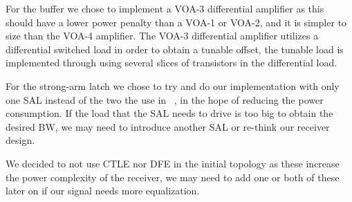 For the buffer we chose to implement a VOA-3 differential amplifier as this should have a lower power penalty than a VOA-1 or VOA-2, and it is simpler to size than the VOA-4 amplifier. The VOA-3 differential amplifier utilizes a differential switched load in order to obtain a tunable offset, the tunable load is implemented through using several slices of transistors in the differential load.

For the strong-arm latch we chose to try and do our implementation with only one SAL instead of the two the use in ~\cite{mahony2010a}, in the hope of reducing the power consumption. If the load that the SAL needs to drive is too big to obtain the desired BW, we may need to introduce another SAL or re-think our receiver design.

We decided to not use CTLE nor DFE in the initial topology as these increase the power complexity of the receiver, we may need to add one or both of these later on if our signal needs more equalization.
